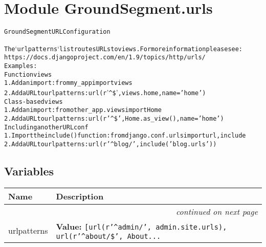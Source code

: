 %
%
%


\section{Module GroundSegment.urls}

    \label{GroundSegment:urls}
\begin{alltt}
GroundSegment URL Configuration

The `urlpatterns` list routes URLs to views. For more information please see:
    https://docs.djangoproject.com/en/1.9/topics/http/urls/
Examples:
Function views
    1. Add an import:  from my\_app import views
    2. Add a URL to urlpatterns:  url(r'{\textasciicircum}\$', views.home, name='home')
Class-based views
    1. Add an import:  from other\_app.views import Home
    2. Add a URL to urlpatterns:  url(r'{\textasciicircum}\$', Home.as\_view(), name='home')
Including another URLconf
    1. Import the include() function: from django.conf.urls import url, include
    2. Add a URL to urlpatterns:  url(r'{\textasciicircum}blog/', include('blog.urls'))
\end{alltt}



  \subsection{Variables}

    \vspace{-1cm}
\hspace{\varindent}\begin{longtable}{|p{\varnamewidth}|p{\vardescrwidth}|l}
\cline{1-2}
\cline{1-2} \centering \textbf{Name} & \centering \textbf{Description}& \\
\cline{1-2}
\endhead\cline{1-2}\multicolumn{3}{r}{\small\textit{continued on next page}}\\\endfoot\cline{1-2}
\endlastfoot\raggedright u\-r\-l\-p\-a\-t\-t\-e\-r\-n\-s\- & \raggedright \textbf{Value:} 
{\tt [url(r'{\textasciicircum}admin/', admin.site.urls), url(r'{\textasciicircum}about/\$', About\texttt{...}}&\\
\cline{1-2}
\end{longtable}

